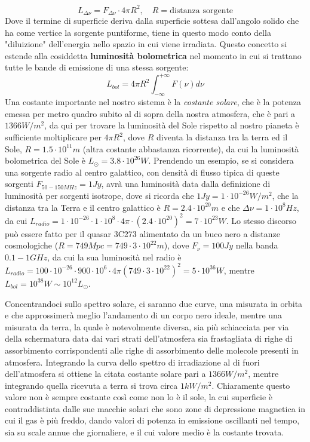 \documentclass[a4paper,twoside,openany,notitlepage]{book}
\newcommand{\e}[1]{\cdot 10^{#1}}
\theoremstyle{definition}
\theoremstyle{plain}
\begin{document}
\begin{equation*}
	L_{\Delta\nu} =F_{\Delta\nu} \cdot 4\pi R^2, \quad R=\text{distanza sorgente}
\end{equation*}
Dove il termine di superficie deriva dalla superficie sottesa dall'angolo solido che ha come vertice la sorgente puntiforme, tiene in questo modo conto della "diluizione" dell'energia nello spazio in cui viene irradiata. Questo concetto si estende alla cosiddetta \textbf{luminosità bolometrica} nel momento in cui si trattano tutte le bande di emissione di una stessa sorgente:
\begin{equation*}
	L_{bol} = 4\pi R^2 \int_{-\infty}^{+\infty} F(\nu) d\nu
\end{equation*}
Una costante importante nel nostro sistema è la \textit{costante solare}, che è la potenza emessa per metro quadro subito al di sopra della nostra atmosfera, che è pari a $1366W/m^2$, da qui per trovare la luminosità del Sole rispetto al nostro pianeta è sufficiente moltiplicare per $4\pi R^2$, dove $R$ diventa la distanza tra la terra ed il Sole, $R=1.5\e{11}m$ (altra costante abbastanza ricorrente), da cui la luminosità bolometrica del Sole è $L_\odot=3.8\e{26}W$. Prendendo un esempio, se si considera una sorgente radio al centro galattico, con densità di flusso tipica di queste sorgenti $F_{50-150MHz}=1Jy$, avrà una luminosità data dalla definizione di luminosità per sorgenti isotrope, dove si ricorda che $1Jy=1\e{-26}W/m^2$, che la distanza tra la Terra e il centro galattico è $R=2.4\e{20}m$ e che $\Delta\nu=1\e{8}Hz$, da cui $L_{radio} = 1\e{-26} \cdot 1\e{8} \cdot 4\pi \cdot (2.4\e{20})^2=7\e{23}W$. Lo stesso discorso può essere fatto per il quasar 3C273 alimentato da un buco nero a distanze cosmologiche ($R=749Mpc=749 \cdot 3\e{22}m$), dove $F_\nu=100Jy$ nella banda $0.1-1GHz$, da cui la sua luminosità nel radio è $L_{radio} = 100\e{-26} \cdot 900\e{6} \cdot 4\pi (749 \cdot 3\e{22})^2 = 5\e{36}W$, mentre $L_{bol} = 10^{38}W\sim10^{12}L_\odot$.

Concentrandoci sullo spettro solare, ci saranno due curve, una misurata in orbita e che approssimerà meglio l'andamento di un corpo nero ideale, mentre una misurata da terra, la quale è notevolmente diversa, sia più schiacciata per via della schermatura data dai vari strati dell'atmosfera sia frastagliata di righe di assorbimento corrispondenti alle righe di assorbimento delle molecole presenti in atmosfera. Integrando la curva dello spettro di irradiazione al di fuori dell'atmosfera si ottiene la citata costante solare pari a $1366W/m^2$, mentre integrando quella ricevuta a terra si trova circa $1kW/m^2$. Chiaramente questo valore non è sempre costante così come non lo è il sole, la cui superficie è contraddistinta dalle sue macchie solari che sono zone di depressione magnetica in cui il gas è più freddo, dando valori di potenza in emissione oscillanti nel tempo, sia su scale annue che giornaliere, e il cui valore medio è la costante trovata.
\end{document}
